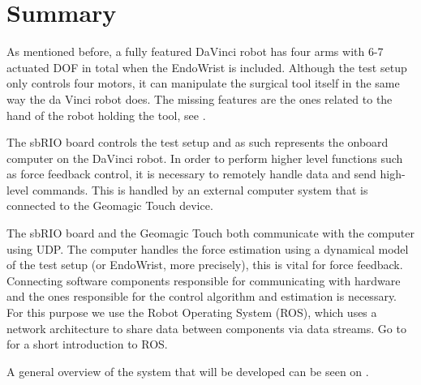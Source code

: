 \section{Summary}
As mentioned before, a fully featured DaVinci robot has four arms with 6-7 actuated \gls{DOF} in total when the EndoWrist is included.
Although the test setup only controls four motors, it can manipulate the surgical tool itself in the same way the da Vinci robot does. The missing features are the ones related to the hand of the robot holding the tool, see .

The sbRIO board controls the test setup and as such represents the onboard computer on the DaVinci robot.
In order to perform higher level functions such as force feedback control, it is necessary to remotely handle data and send high-level commands.
This is handled by an external computer system that is connected to the Geomagic Touch device.

The sbRIO board and the Geomagic Touch both communicate with the computer using UDP. The computer handles the force estimation using a dynamical model of the test setup (or EndoWrist, more precisely), this is vital for force feedback.
Connecting software components responsible for communicating with hardware and the ones responsible for the control algorithm and estimation is necessary.
For this purpose we use the Robot Operating System (ROS), which uses a network architecture to share data between components via data streams. Go to  for a short introduction to ROS.

A general overview of the system that will be developed can be seen on .





